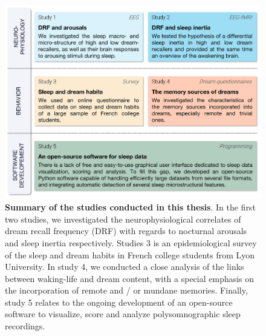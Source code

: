 \begin{figure}[htb]
	\includegraphics[width=\textwidth]{Fig/Intro/Intro_Problematics/Intro_Problematics.png}
	\caption[Summary of the studies conducted in this thesis]{\textbf{Summary of the studies conducted in this thesis}. In the first two studies, we investigated the neurophysiological correlates of dream recall frequency (DRF) with regards to nocturnal arousals and sleep inertia respectively. Studies 3 is an epidemiological survey of the sleep and dream habits in French college students from Lyon University. In study 4, we conducted a close analysis of the links between waking-life and dream content, with a special emphasis on the incorporation of remote and / or mundane memories. Finally, study 5 relates to the ongoing development of an open-source software to visualize, score and analyze polysomnographic sleep recordings.}
	\label{fig:intro:problematics-summary}
\end{figure}
